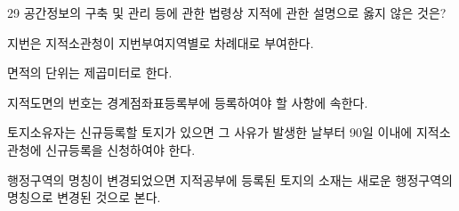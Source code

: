 \begin{question}{29}
공간정보의 구축 및 관리 등에 관한 법령상 지적에 관한 설명으로 옳지 않은 것은?
\begin{choices}
  \item 지번은 지적소관청이 지번부여지역별로 차례대로 부여한다.
  \item 면적의 단위는 제곱미터로 한다.
  \item 지적도면의 번호는 경계점좌표등록부에 등록하여야 할 사항에 속한다.
  \item 토지소유자는 신규등록할 토지가 있으면 그 사유가 발생한 날부터 90일 이내에 지적소관청에 신규등록을 신청하여야 한다.
  \item 행정구역의 명칭이 변경되었으면 지적공부에 등록된 토지의 소재는 새로운 행정구역의 명칭으로 변경된 것으로 본다.
\end{choices}
\end{question}
